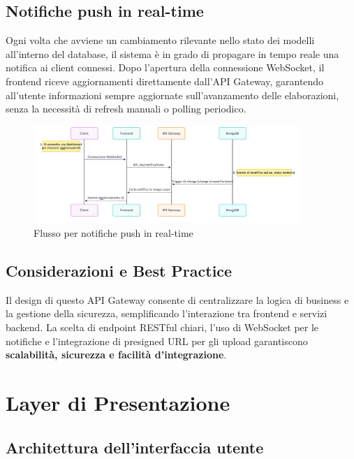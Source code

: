 \newpage
\subsection{Notifiche push in real-time}
Ogni volta che avviene un cambiamento rilevante nello stato dei modelli all’interno del database, il sistema è in grado di propagare in tempo reale una notifica ai client connessi. Dopo l’apertura della connessione WebSocket, il frontend riceve aggiornamenti direttamente dall’API Gateway, garantendo all’utente informazioni sempre aggiornate sull’avanzamento delle elaborazioni, senza la necessità di refresh manuali o polling periodico.

\begin{figure}[ht]
	\centering
	\includegraphics[width=0.9\textwidth]{images/push_notification_flow.jpg}
	\caption{Flusso per notifiche push in real-time}
	\label{fig:push_notification}
\end{figure}
\subsection{Considerazioni e Best Practice}

Il design di questo API Gateway consente di centralizzare la logica di business e la gestione della sicurezza, semplificando l’interazione tra frontend e servizi backend. La scelta di endpoint RESTful chiari, l’uso di WebSocket per le notifiche e l’integrazione di presigned URL per gli upload garantiscono \textbf{scalabilità, sicurezza e facilità d’integrazione}.


		


\section{Layer di Presentazione}

\subsection{Architettura dell'interfaccia utente}

